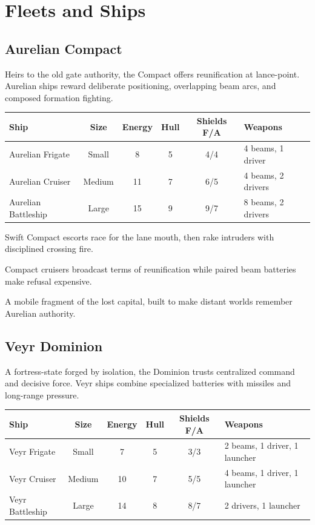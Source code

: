 \chapter{Fleets and Ships}

\section{Aurelian Compact}

Heirs to the old gate authority, the Compact offers reunification at lance-point. Aurelian ships reward deliberate positioning, overlapping beam arcs, and composed formation fighting.

\begin{tabularx}{\linewidth}{l c c c c Y}\toprule
Ship & Size & Energy & Hull & Shields F/A & Weapons\\\midrule
Aurelian Frigate & Small & 8 & 5 & 4/4 & 4 beams, 1 driver\\
Aurelian Cruiser & Medium & 11 & 7 & 6/5 & 4 beams, 2 drivers\\
Aurelian Battleship & Large & 15 & 9 & 9/7 & 8 beams, 2 drivers\\\bottomrule
\end{tabularx}

\begin{description}[style=nextline,leftmargin=0pt]
  \item[Aurelian Frigate] Swift Compact escorts race for the lane mouth, then rake intruders with disciplined crossing fire.
  \item[Aurelian Cruiser] Compact cruisers broadcast terms of reunification while paired beam batteries make refusal expensive.
  \item[Aurelian Battleship] A mobile fragment of the lost capital, built to make distant worlds remember Aurelian authority.
\end{description}

\section{Veyr Dominion}

A fortress-state forged by isolation, the Dominion trusts centralized command and decisive force. Veyr ships combine specialized batteries with missiles and long-range pressure.

\begin{tabularx}{\linewidth}{l c c c c Y}\toprule
Ship & Size & Energy & Hull & Shields F/A & Weapons\\\midrule
Veyr Frigate & Small & 7 & 5 & 3/3 & 2 beams, 1 driver, 1 launcher\\
Veyr Cruiser & Medium & 10 & 7 & 5/5 & 4 beams, 1 driver, 1 launcher\\
Veyr Battleship & Large & 14 & 8 & 8/7 & 2 drivers, 1 launcher\\\bottomrule
\end{tabularx}

